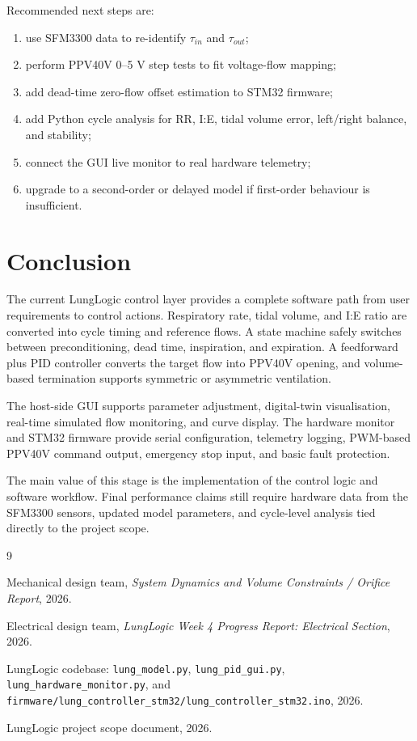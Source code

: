 \documentclass[11pt,a4paper]{article}
\begin{document}
Recommended next steps are:

\begin{enumerate}
  \item use SFM3300 data to re-identify $\tau_{in}$ and $\tau_{out}$;
  \item perform PPV40V 0--5 V step tests to fit voltage-flow mapping;
  \item add dead-time zero-flow offset estimation to STM32 firmware;
  \item add Python cycle analysis for RR, I:E, tidal volume error, left/right balance, and stability;
  \item connect the GUI live monitor to real hardware telemetry;
  \item upgrade to a second-order or delayed model if first-order behaviour is insufficient.
\end{enumerate}

\section{Conclusion}

The current LungLogic control layer provides a complete software path from user requirements to control actions. Respiratory rate, tidal volume, and I:E ratio are converted into cycle timing and reference flows. A state machine safely switches between preconditioning, dead time, inspiration, and expiration. A feedforward plus PID controller converts the target flow into PPV40V opening, and volume-based termination supports symmetric or asymmetric ventilation.

The host-side GUI supports parameter adjustment, digital-twin visualisation, real-time simulated flow monitoring, and curve display. The hardware monitor and STM32 firmware provide serial configuration, telemetry logging, PWM-based PPV40V command output, emergency stop input, and basic fault protection.

The main value of this stage is the implementation of the control logic and software workflow. Final performance claims still require hardware data from the SFM3300 sensors, updated model parameters, and cycle-level analysis tied directly to the project scope.

\begin{thebibliography}{9}

Mechanical design team, \textit{System Dynamics and Volume Constraints / Orifice Report}, 2026.

Electrical design team, \textit{LungLogic Week 4 Progress Report: Electrical Section}, 2026.

LungLogic codebase: \texttt{lung\_model.py}, \texttt{lung\_pid\_gui.py}, \texttt{lung\_hardware\_monitor.py}, and \texttt{firmware/lung\_controller\_stm32/lung\_controller\_stm32.ino}, 2026.

LungLogic project scope document, 2026.

\end{thebibliography}
\end{document}
